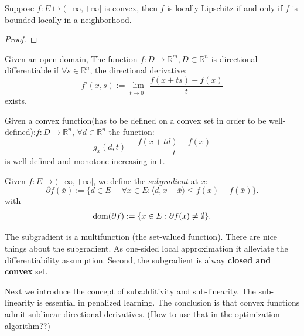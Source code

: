 \begin{theorem}
Suppose $f: E \mapsto (-\infty, + \infty]$ is convex, then $f$ is locally Lipschitz if and only if $f$ is bounded locally in a neighborhood. 
\end{theorem}
\begin{proof}
\end{proof}

\begin{definition}
	Given an open domain, The function $f:D \longrightarrow \mathbb{R}^m, D \subset \mathbb{R}^n$ is directional differentiable if $\forall s \in \mathbb{R}^n$, the directional derivative:
	\begin{equation}
		f'(x,s) := \lim_{t \rightarrow 0^+}\frac{f(x + ts) - f(x)}{t} 
	\end{equation}
 exists.
\end{definition}

\begin{lemma}
	Given a convex function(has to be defined on a convex set in order to be well-defined):$f: D \longrightarrow \mathbb{R}^n$, $\forall d \in \mathbb{R}^n$ the function:
	\begin{equation}
		g_x(d, t) = \frac{f(x + td) - f(x)}{t}
	\end{equation}
	is well-defined and monotone increasing in t.
\end{lemma}

\begin{definition}[subgradient]
	Given $f: E \rightarrow (-\infty, +\infty]$, we define the \textit{subgradient} at $\bar{x}$:
	\begin{equation*}
		\partial f(\bar{x}):= \{ d \in E| \quad \forall x \in E: \langle d, x - \bar{x} \rangle \le f(x) - f(\bar{x})\}.
	\end{equation*}
	with 
	\begin{align*}
		\operatorname{dom}(\partial f):= \{ x \in E: \partial f(x) \neq \emptyset\}. 
	\end{align*}
\end{definition}
The subgradient is a multifunction (the set-valued function). There are nice things about the subgradient. As one-sided local approximation it alleviate the differentiability assumption. Second, the subgradient is alway \textbf{closed and convex} set. 


Next we introduce the concept of subadditivity and sub-linearity. The sub-linearity is essential in penalized learning. The conclusion is that convex functions admit sublinear directional derivatives. (How to use that in the optimization algorithm??)



